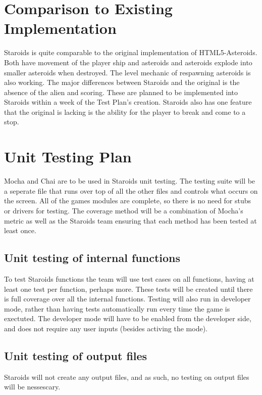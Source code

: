 \documentclass[12pt, titlepage]{article}
\begin{document}
\section{Comparison to Existing Implementation}
Staroids is quite comparable to the original implementation of HTML5-Asteroids. Both have movement of the player ship and asteroids and asteroids explode into smaller asteroids when destroyed. The level mechanic of respawning asteroids is also working. The major differences between Staroids and the original is the absence of the alien and scoring. These are planned to be implemented into Staroids within a week of the Test Plan's creation. Staroids also has one feature that the original is lacking is the ability for the player to break and come to a stop.

\section{Unit Testing Plan}
Mocha and Chai are to be used in Staroids unit testing. The testing suite will be a seperate file that runs over top of all the other files and controls what occurs on the screen. All of the games modules are complete, so there is no need for stubs or drivers for testing. The coverage method will be a combination of  Mocha's metric as well as the Staroids team ensuring that each method has been tested at least once.

\subsection{Unit testing of internal functions}
To test Staroids functions the team will use test cases on all functions, having at least one test per function, perhaps more. These tests will be created until there is full coverage over all the internal functions. Testing will also run in developer mode, rather than having tests automatically run every time the game is exectuted. The developer mode will have to be enabled from the developer side, and does not require any user inputs (besides activing the mode).

\subsection{Unit testing of output files}
Staroids will not create any output files, and as such, no testing on output files will be nessescary.




\end{document}

